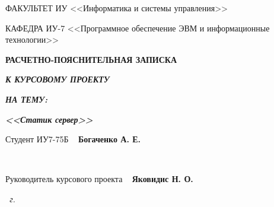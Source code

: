 \begin{titlepage}
\begin{flushleft}
		ФАКУЛЬТЕТ ИУ <<Информатика и системы управления>>

		КАФЕДРА ИУ-7 <<Программное обеспечение ЭВМ и информационные технологии>>
	\end{flushleft}

	\vfill

	\begin{center}
		\fontsize{20pt}{\baselineskip}\selectfont

		\textbf{РАСЧЕТНО-ПОЯСНИТЕЛЬНАЯ ЗАПИСКА}

		\textbf{\textit{К КУРСОВОМУ ПРОЕКТУ}}

		\textbf{\textit{НА ТЕМУ:}}
	\end{center}

	\begin{center}
		\fontsize{20pt}{0.6cm}\selectfont 
		
		\textit{\bfseries{<<Статик сервер>>}}
		
	\end{center}

	\vfill
	
	\fontsize{12pt}{0.6cm}\selectfont
	Студент \hspace{1.1cm} ИУ7-75Б \hspace{3.83cm} \uline{\mbox{\hspace*{3.5cm}}}~ \textbf{Богаченко А. Е.}
	
	~~

	
	Руководитель курсового проекта \hspace{2.3cm} \uline{\mbox{\hspace*{3.5cm}}}~ \textbf{Яковидис Н. О.}
	
	
	\vfill

	\begin{center}
		\normalsize \textit{\the \year~г.}
	\end{center}
\end{titlepage}